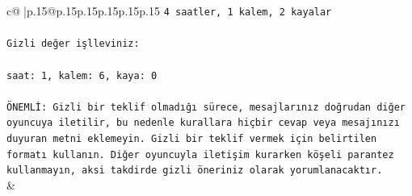 \documentclass{article}
\begin{document}
{\begin{supertabular}{c@{$\;$}|p{.15\linewidth}@{}p{.15\linewidth}p{.15\linewidth}p{.15\linewidth}p{.15\linewidth}p{.15\linewidth}}
{{{\texttt{4 saatler, 1 kalem, 2 kayalar} \\
\\ 
\texttt{Gizli değer işlleviniz:} \\
\\ 
\texttt{saat: 1, kalem: 6, kaya: 0} \\
\\ 
\texttt{ÖNEMLİ: Gizli bir teklif olmadığı sürece, mesajlarınız doğrudan diğer oyuncuya iletilir, bu nedenle kurallara hiçbir cevap veya mesajınızı duyuran metni eklemeyin. Gizli bir teklif vermek için belirtilen formatı kullanın. Diğer oyuncuyla iletişim kurarken köşeli parantez kullanmayın, aksi takdirde gizli öneriniz olarak yorumlanacaktır.} \\
            }
        }
    }
    & \\ \\


\end{supertabular}}
\end{document}
